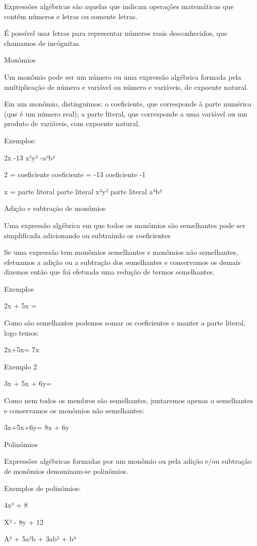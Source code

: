 Expressões algébricas são aquelas que indicam operações matemáticas que
contêm números e letras ou somente letras.

É possível usar letras para representar números reais desconhecidos, que
chamamos de incógnitas.

Monômios

Um monômio pode ser um número ou uma expressão algébrica formada pela
multiplicação de número e variável ou número e variáveis, de expoente
natural.

Em um monômio, distinguimos: o coeficiente, que corresponde à parte
numérica (que é um número real); a parte literal, que corresponde a uma
variável ou um produto de variáveis, com expoente natural.

Exemplos:

2x -13 x²y² -a³b²

2 = coeficiente coeficiente = -13 coeficiente -1

x = parte literal parte literal x²y² parte literal a³b²

Adição e subtração de monômios

Uma expressão algébrica em que todos os monômios são semelhantes pode
ser simplificada adicionando ou subtraindo os coeficientes

Se uma expressão tem monômios semelhantes e monômios não semelhantes,
efetuamos a adição ou a subtração dos semelhantes e conservamos os
demais dizemos então que foi efetuada uma redução de termos semelhantes.

Exemplos

2x + 5x =

Como são semelhantes podemos somar os coeficientes e manter a parte
literal, logo temos:

2x+5x= 7x

Exemplo 2

3x + 5x + 6y=

Como nem todos os membros são semelhantes, juntaremos apenas o
semelhantes e conservamos os monômios não semelhantes:

3x+5x+6y= 8x + 6y

Polinômios

Expressões algébricas formadas por um monômio ou pela adição e/ou
subtração de monômios denominam-se polinômios.

Exemplos de polinômios:

4x² + 8

X² - 8y + 12

A² + 5a²b + 3ab² + b³

